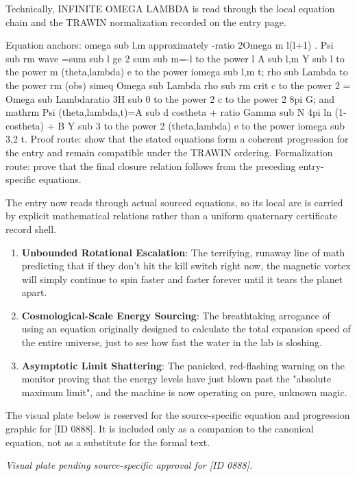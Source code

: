 Technically, INFINITE OMEGA LAMBDA is read through the local equation chain and the TRAWIN normalization recorded on the entry page.

Equation anchors: omega sub l,m approximately -ratio 2Omega m l(l+1) . Psi sub rm wave =sum sub l ge 2 sum sub m=-l to the power l A sub l,m Y sub l to the power m (theta,lambda) e to the power iomega sub l,m t; rho sub Lambda to the power rm (obs) simeq Omega sub Lambda rho sub rm crit c to the power 2 = Omega sub Lambdaratio 3H sub 0 to the power 2 c to the power 2 8pi G; and mathrm Psi (theta,lambda,t)=A sub d costheta + ratio Gamma sub N 4pi ln (1-costheta) + B Y sub 3 to the power 2 (theta,lambda) e to the power iomega sub 3,2 t. Proof route: show that the stated equations form a coherent progression for the entry and remain compatible under the TRAWIN ordering. Formalization route: prove that the final closure relation follows from the preceding entry-specific equations.

The entry now reads through actual sourced equations, so its local arc is carried by explicit mathematical relations rather than a uniform quaternary certificate record shell.
\endgroup

\begin{enumerate}[leftmargin=1.6em,itemsep=6pt,topsep=4pt]
\item \textbf{Unbounded Rotational Escalation}: The terrifying, runaway line of math predicting that if they don't hit the kill switch right now, the magnetic vortex will simply continue to spin faster and faster forever until it tears the planet apart.
\item \textbf{Cosmological-Scale Energy Sourcing}: The breathtaking arrogance of using an equation originally designed to calculate the total expansion speed of the entire universe, just to see how fast the water in the lab is sloshing.
\item \textbf{Asymptotic Limit Shattering}: The panicked, red-flashing warning on the monitor proving that the energy levels have just blown past the "absolute maximum limit", and the machine is now operating on pure, unknown magic.
\end{enumerate}

\begingroup\footnotesize\sloppy
The visual plate below is reserved for the source-specific equation and progression graphic for [ID 0888]. It is included only as a companion to the canonical equation, not as a substitute for the formal text.
\par\endgroup
\begingroup\footnotesize\itshape
Visual plate pending source-specific approval for [ID 0888].
\par\endgroup

